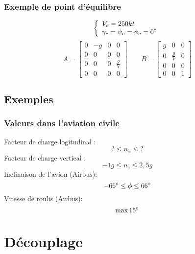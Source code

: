 \documentclass[footheight=2em]{beamer}
\begin{document}
\begin{frame}
    \frametitle{Exemple de point d'équilibre}\pause
    $$
    \left\{
    \begin{array}{l}
        V_e = 250 kt \\
        \gamma_e = \psi_e = \phi_e = 0 \degree
    \end{array}
    \right.
    $$
    $$
    A =
    \left[
    \begin{array}{cccc}
        0 & -g & 0 & 0 \\
        0 & 0 & 0 & 0 \\
        0 & 0 & 0 & \frac{g}{V} \\
        0 & 0 & 0 & 0
    \end{array}
    \right]
    \qquad
    B =
    \left[
    \begin{array}{cccc}
        g & 0 & 0 \\
        0 & \frac{g}{V} & 0 \\
        0 & 0 & 0 \\
        0 & 0 & 1
    \end{array}
    \right]
    $$
\end{frame}

\subsection{Exemples}

\begin{frame}
    \frametitle{Valeurs dans l'aviation civile}\pause
    Facteur de charge logitudinal :
    $$
    ? \le n_x \le ?
    $$\pause
    Facteur de charge vertical :
    $$
    -1g \le n_z \le 2,5g
    $$\pause
    Inclinaison de l'avion (Airbus):
    $$
    -66\degree \le \phi \le 66\degree
    $$\pause
    Vitesse de roulis (Airbus):
    $$
    \max 15\degree
    $$
\end{frame}

\section{D\'ecouplage}
\end{document}
